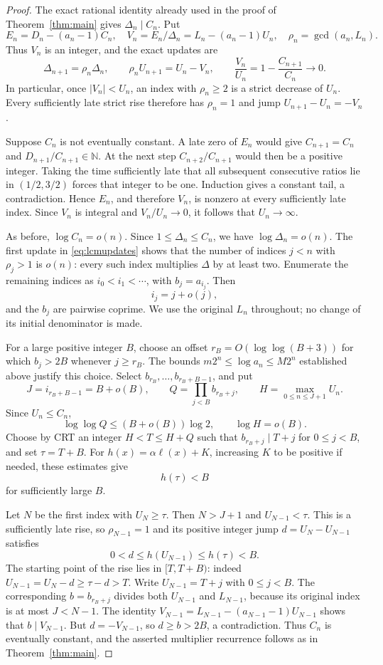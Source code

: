 \documentclass[11pt]{article}
\newcommand{\ellog}{\ell}
\begin{document}
\begin{proof}
The exact rational identity already used in the proof of
Theorem~\ref{thm:main} gives $\Delta_n\mid C_n$.
Put
\[
 E_n=D_n-(a_n-1)C_n,\quad
 V_n=E_n/\Delta_n=L_n-(a_n-1)U_n,\quad
 \rho_n=\gcd(a_n,L_n).
\]
Thus $V_n$ is an integer, and the exact updates are
\begin{equation}\label{eq:lcmupdates}
 \Delta_{n+1}=\rho_n\Delta_n,\qquad
 \rho_n U_{n+1}=U_n-V_n,\qquad
 \frac{V_n}{U_n}=1-\frac{C_{n+1}}{C_n}\longrightarrow0.
\end{equation}
In particular, once $|V_n|<U_n$, an index with $\rho_n\ge2$ is a strict
decrease of $U_n$. Every sufficiently late strict rise therefore has
$\rho_n=1$ and jump $U_{n+1}-U_n=-V_n$.

Suppose $C_n$ is not eventually constant. A late zero of $E_n$ would
give $C_{n+1}=C_n$ and $D_{n+1}/C_{n+1}\in\mathbb N$. At the next
step $C_{n+2}/C_{n+1}$ would then be a positive integer. Taking the
time sufficiently late that all subsequent consecutive ratios lie in
$(1/2,3/2)$ forces that integer to be one. Induction gives a constant
tail, a contradiction. Hence $E_n$, and therefore $V_n$, is nonzero
at every sufficiently late index. Since $V_n$ is integral and
$V_n/U_n\to0$, it follows that $U_n\to\infty$.

As before, $\log C_n=o(n)$. Since
$1\le\Delta_n\le C_n$, we have $\log\Delta_n=o(n)$.
The first update in \eqref{eq:lcmupdates} shows that the number of
indices $j<n$ with $\rho_j>1$ is $o(n)$: every such index multiplies
$\Delta$ by at least two. Enumerate the remaining indices as
$i_0<i_1<\cdots$, with $b_j=a_{i_j}$. Then
\[
 i_j=j+o(j),
\]
and the $b_j$ are pairwise coprime. We use the original $L_n$ throughout;
no change of its initial denominator is made.

For a large positive integer $B$, choose an offset
$r_B=O(\log\log(B+3))$ for which $b_j>2B$ whenever $j\ge r_B$.
The bounds $m2^n\le\log a_n\le M2^n$ established above justify this
choice. Select $b_{r_B},\ldots,b_{r_B+B-1}$, and put
\[
 J=i_{r_B+B-1}=B+o(B),\qquad
 Q=\prod_{j<B}b_{r_B+j},\qquad H=\max_{0\le n\le J+1}U_n.
\]
Since $U_n\le C_n$,
\[
 \log\log Q\le(B+o(B))\log2,\qquad \log H=o(B).
\]
Choose by CRT an integer $H<T\le H+Q$ such that
$b_{r_B+j}\mid T+j$ for $0\le j<B$, and set $\tau=T+B$.
For $h(x)=\alpha\ellog(x)+K$, increasing $K$ to be positive if needed,
these estimates give
\[
 h(\tau)<B
\]
for sufficiently large $B$.

Let $N$ be the first index with $U_N\ge\tau$. Then $N>J+1$ and
$U_{N-1}<\tau$. This is a sufficiently late rise, so
$\rho_{N-1}=1$ and its positive integer jump $d=U_N-U_{N-1}$ satisfies
\[
 0<d\le h(U_{N-1})\le h(\tau)<B.
\]
The starting point of the rise lies in $[T,T+B)$: indeed
$U_{N-1}=U_N-d\ge\tau-d>T$. Write $U_{N-1}=T+j$ with $0\le j<B$.
The corresponding $b=b_{r_B+j}$ divides both $U_{N-1}$ and $L_{N-1}$,
because its original index is at most $J<N-1$.
The identity $V_{N-1}=L_{N-1}-(a_{N-1}-1)U_{N-1}$ shows that $b\mid V_{N-1}$.
But $d=-V_{N-1}$, so $d\ge b>2B$, a contradiction.
Thus $C_n$ is eventually constant, and the asserted multiplier recurrence
follows as in Theorem~\ref{thm:main}.
\end{proof}
\end{document}
